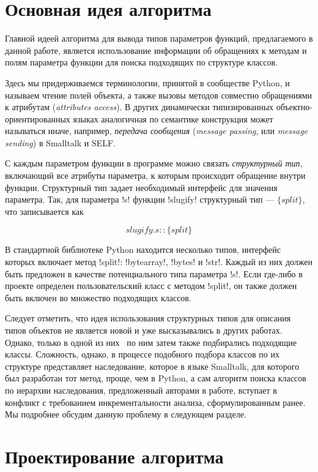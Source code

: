 \section{Основная идея алгоритма}
\label{sec:main-idea}

Главной идеей алгоритма для вывода типов параметров функций, предлагаемого в
данной работе, является использование информации об обращениях к методам и полям
параметра функции для поиска подходящих по структуре классов. 

Здесь мы придерживаемся терминологии, принятой в сообществе Python, и называем
чтение полей объекта, а также вызовы методов совместно обращениями к атрибутам
(\emph{attributes access}). В других динамически типизированных
объектно-ориентированных языках аналогичная по семантике конструкция может
называться иначе, например, \emph{передача сообщения} (\emph{message passing},
или \emph{message sending}) в Smalltalk и SELF.

С каждым параметром функции в программе можно связать \emph{структурный тип},
включающий все атрибуты параметра, к которым происходит обращение внутри
функции. Структурный тип задает необходимый интерфейс для значения параметра.
Так, для параметра !s! функции !slugify! структурный тип --- $\{split\}$, что
записывается как 

\[
    slugify.s :: \{ split \}
\]

В стандартной библиотеке Python находится несколько типов, интерфейс которых
включает метод !split!: !bytearray!, !bytes! и !str!. Каждый из
них должен быть предложен в качестве потенциального типа параметра !s!. Если
где-либо в проекте определен пользовательский класс с методом !split!, он также
должен быть включен во множество подходящих классов.

Следует отметить, что идея использования структурных типов для описания типов
объектов не является новой и уже высказывались в других работах.  Однако, только
в одной из них~\cite{Pluquet2009} по ним затем также подбирались подходящие
классы. Сложность, однако, в процессе подобного подбора классов по их
структуре представляет наследование, которое в языке Smalltalk, для которого был
разработан тот метод, проще, чем в Python, а сам алгоритм поиска классов по
иерархии наследования, предложенный авторами в работе, вступает в конфликт с
требованием инкрементальности анализа, сформулированным ранее. Мы подробнее
обсудим данную проблему в следующем разделе.

\section{Проектирование алгоритма}
\label{sec:algorithm-design}

